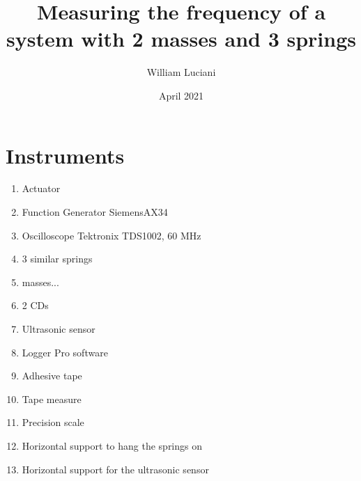 \documentclass{article}
\title{ Measuring the frequency  of a system with 2 masses and 3 springs}
\author{William Luciani}
\date{April 2021}
\begin{document}
\maketitle

\begin{abstract}
\end{abstract}

\section{Instruments} \label{sec:instr}
\begin{enumerate}
    \item Actuator
    \item Function Generator SiemensAX34
    \item Oscilloscope Tektronix TDS1002, 60 MHz
    \item 3 similar springs
    \item masses...
    \item 2 CDs
    \item Ultrasonic sensor
    \item Logger Pro software
    \item Adhesive tape
    \item Tape measure
    \item Precision scale
    \item Horizontal support to hang the springs on
    \item Horizontal support for the ultrasonic
          sensor
\end{enumerate}
\end{document}
